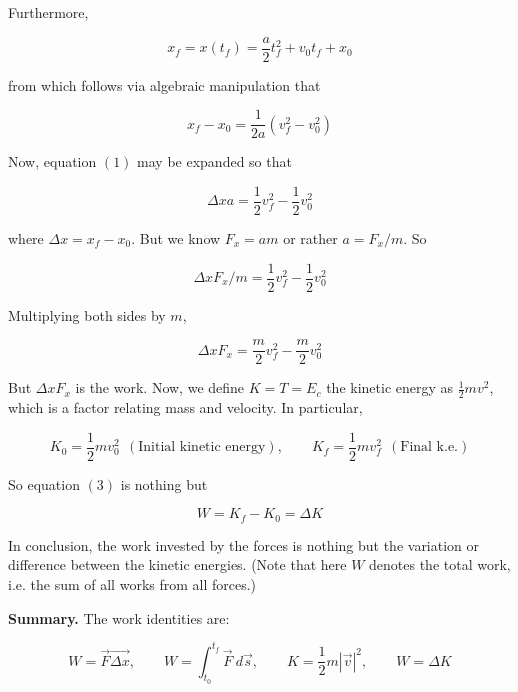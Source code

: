 \documentclass[12pt]{article}
\theoremstyle{definition}
\begin{document}
Furthermore, 

\begin{equation*}
    x_f = x(t_f) = \frac{a}{2} t_f^2 + v_0 t_f + x_0
\end{equation*}

from which follows via algebraic manipulation that 

\begin{equation}
    x_f - x_0 = \frac{1}{2a}(v_f^2 - v_0^2)
\end{equation}

Now, equation $(1)$ may be expanded so that 

\begin{equation*}
    \Delta x a = \frac{1}{2}v_f^2 - \frac{1}{2}v_0^2
\end{equation*}

where $\Delta x = x_f - x_0$. But we know $F_x = am$ or rather $a = F_x / m$. So 

\begin{equation}
    \Delta x F_x / m = \frac{1}{2}v^2_f - \frac{1}{2}v_0^2
\end{equation}

Multiplying both sides by $m$, 

\begin{equation}
    \Delta x F_x = \frac{m}{2}v_f^2 - \frac{m}{2}v_0^2
\end{equation}

But $\Delta x F_x$ is the work. Now, we define $K = T = E_c$ the kinetic energy
as $\frac{1}{2}mv^2$, which is a factor relating mass and velocity. In
particular, 

\begin{equation*}
    K_0 = \frac{1}{2}mv_0^2 ~ ~ \left( \text{Initial kinetic energy} \right), \qquad
    K_f = \frac{1}{2}m v_f^2 ~ ~ (\text{Final k.e.})
\end{equation*}

So equation $(3)$ is nothing but 

\begin{equation}
    W = K_f - K_0 = \Delta K
\end{equation}

In conclusion, the work invested by the forces is nothing but the variation or
difference between the kinetic energies. (Note that here $W$ denotes  the total
work, i.e. the sum of all works from all forces.)

\begin{shaded}
    \textbf{Summary.} The work identities are:

    \begin{equation*}
        W = \vec{F} \vec{\Delta x}, \qquad W = \int_{t_0}^{t_f} \vec{F} ~ d\vec{s}, \qquad K = \frac{1}{2}m \left| \vec{v}
        \right|^2, \qquad W = \Delta K
    \end{equation*}
\end{shaded}
\end{document}

